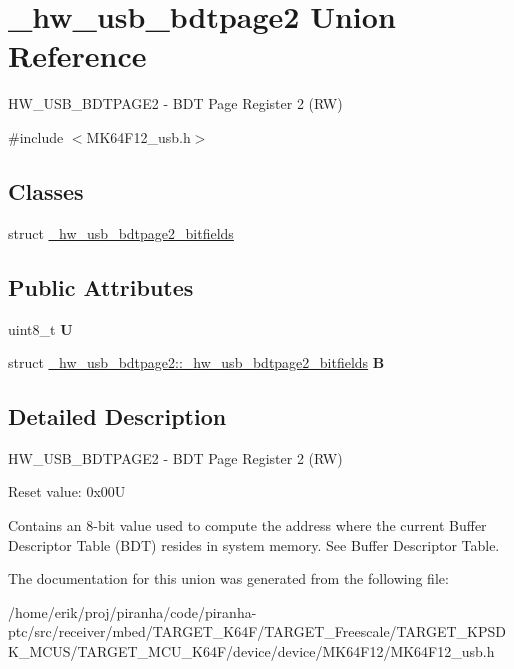 \hypertarget{union__hw__usb__bdtpage2}{}\section{\+\_\+hw\+\_\+usb\+\_\+bdtpage2 Union Reference}
\label{union__hw__usb__bdtpage2}


H\+W\+\_\+\+U\+S\+B\+\_\+\+B\+D\+T\+P\+A\+G\+E2 -\/ B\+DT Page Register 2 (RW)  




{\ttfamily \#include $<$M\+K64\+F12\+\_\+usb.\+h$>$}

\subsection*{Classes}
\begin{DoxyCompactItemize}
\item 
struct \hyperlink{struct__hw__usb__bdtpage2_1_1__hw__usb__bdtpage2__bitfields}{\+\_\+hw\+\_\+usb\+\_\+bdtpage2\+\_\+bitfields}
\end{DoxyCompactItemize}
\subsection*{Public Attributes}
\begin{DoxyCompactItemize}
\item 
uint8\+\_\+t {\bfseries U}\hypertarget{union__hw__usb__bdtpage2_a68cf9051087c2f132255178d2f4f7ffd}{}\label{union__hw__usb__bdtpage2_a68cf9051087c2f132255178d2f4f7ffd}

\item 
struct \hyperlink{struct__hw__usb__bdtpage2_1_1__hw__usb__bdtpage2__bitfields}{\+\_\+hw\+\_\+usb\+\_\+bdtpage2\+::\+\_\+hw\+\_\+usb\+\_\+bdtpage2\+\_\+bitfields} {\bfseries B}\hypertarget{union__hw__usb__bdtpage2_a51e2d5e40e55764c98b89896da7ca62f}{}\label{union__hw__usb__bdtpage2_a51e2d5e40e55764c98b89896da7ca62f}

\end{DoxyCompactItemize}


\subsection{Detailed Description}
H\+W\+\_\+\+U\+S\+B\+\_\+\+B\+D\+T\+P\+A\+G\+E2 -\/ B\+DT Page Register 2 (RW) 

Reset value\+: 0x00U

Contains an 8-\/bit value used to compute the address where the current Buffer Descriptor Table (B\+DT) resides in system memory. See Buffer Descriptor Table. 

The documentation for this union was generated from the following file\+:\begin{DoxyCompactItemize}
\item 
/home/erik/proj/piranha/code/piranha-\/ptc/src/receiver/mbed/\+T\+A\+R\+G\+E\+T\+\_\+\+K64\+F/\+T\+A\+R\+G\+E\+T\+\_\+\+Freescale/\+T\+A\+R\+G\+E\+T\+\_\+\+K\+P\+S\+D\+K\+\_\+\+M\+C\+U\+S/\+T\+A\+R\+G\+E\+T\+\_\+\+M\+C\+U\+\_\+\+K64\+F/device/device/\+M\+K64\+F12/M\+K64\+F12\+\_\+usb.\+h\end{DoxyCompactItemize}

